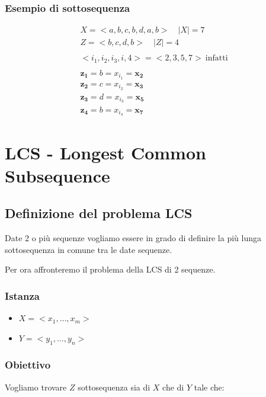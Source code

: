         \subsection{Esempio di sottosequenza}
        {
            \Large

            \begin{gather*}
                X = <a, b, c, b, d, a, b> \quad |X|=7 \\
                Z = <b, c, d, b> \quad |Z| = 4 \\ 
                \\
                <i_1, i_2, i_3, i,4> = <2, 3, 5, 7> \ \text{infatti} \\ 
                \\
                \mathbf{z_1} = b = x_{i_{1}} = \mathbf{x_2} \\
                \mathbf{z_2} = c = x_{i_2} = \mathbf{x_3} \\
                \mathbf{z_3} = d = x_{i_3} = \mathbf{x_5} \\
                \mathbf{z_4} = b = x_{i_4} = \mathbf{x_7}
            \end{gather*}
        }


\chapter{LCS - Longest Common Subsequence}

\section{Definizione del problema LCS}
Date 2 o più sequenze vogliamo essere in grado di definire la più lunga sottosequenza in comune tra le date sequenze.

Per ora affronteremo il problema della LCS di 2 sequenze.

\subsection{Istanza}
\begin{itemize}
    \item $X= <x_1, \dots , x_m>$
    \item $Y = <y_1, \dots, y_n>$
\end{itemize}

\subsection{Obiettivo}
Vogliamo trovare $Z$ sottosequenza sia di $X$ che di $Y$ tale che:


